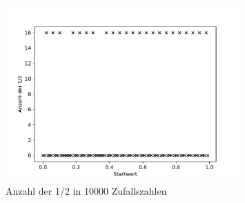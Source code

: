 \begin{figure}[H]
  \centering
  \includegraphics[width=0.8\textwidth]{nr8_f.pdf}
  \caption{Anzahl der 1/2 in 10000 Zufallszahlen}
\end{figure}



